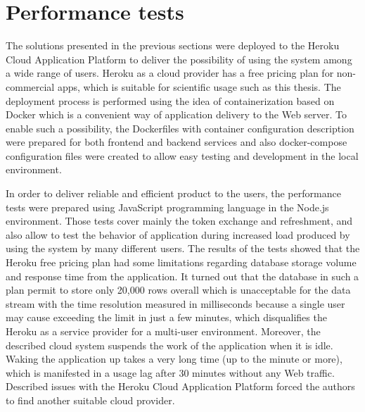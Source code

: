 \section{Performance tests}\label{sec:performance-tests}
The solutions presented in the previous sections were deployed to the Heroku Cloud Application Platform to deliver the possibility of using the system among a wide range of users.
Heroku as a cloud provider has a free pricing plan for non-commercial apps, which is suitable for scientific usage such as this thesis.
The deployment process is performed using the idea of containerization based on Docker which is a convenient way of application delivery to the Web server.
To enable such a possibility, the \mbox{Dockerfiles} with container configuration description were prepared for both frontend and backend services and also docker-compose configuration files were created to allow easy testing and development in the local environment.

In order to deliver reliable and efficient product to the users, the performance tests were prepared using JavaScript programming language in the Node.js environment.
Those tests cover mainly the token exchange and refreshment, and also allow to test the behavior of application during increased load produced by using the system by many different users.
The results of the tests showed that the Heroku free pricing plan had some limitations regarding database storage volume and response time from the application.
It turned out that the database in such a plan permit to store only 20,000 rows overall which is unacceptable for the data stream with the time resolution measured in milliseconds because a single user may cause exceeding the limit in just a few minutes, which disqualifies the Heroku as a service provider for a multi-user environment.
Moreover, the described cloud system suspends the work of the application when it is idle.
Waking the application up takes a very long time (up to the minute or more), which is manifested in a usage lag after 30 minutes without any Web traffic.
Described issues with the Heroku Cloud Application Platform forced the authors to find another suitable cloud provider.
